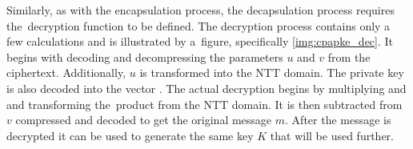 Similarly, as with the encapsulation process, the decapsulation process requires the~decryption function to be defined. The decryption process contains only a few calculations and is illustrated by a~figure, specifically \ref{img:cpapke_dec}. It begins with decoding and decompressing the parameters $u$ and $v$ from the ciphertext. Additionally, $u$ is transformed into the NTT domain. The private key is also decoded into the vector . The actual decryption begins by multiplying  and  and transforming the~product from the NTT domain. It is then subtracted from $v$ compressed and decoded to get the original message $m$. After the message is decrypted it can be used to generate the same key $K$ that will be used further.
\clearpage
{}

